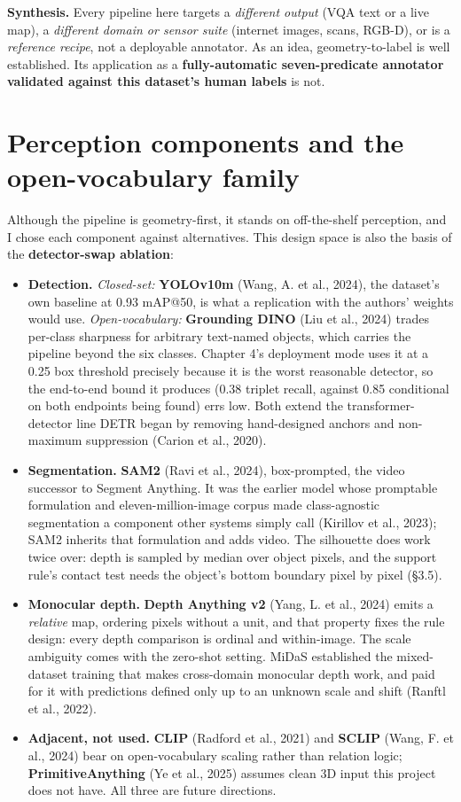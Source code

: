 \textbf{Synthesis.} Every pipeline here targets a \textit{different output} (VQA text or a live map), a \textit{different domain or sensor suite} (internet images, scans, RGB-D), or is a \textit{reference recipe}, not a deployable annotator. As an idea, geometry-to-label is well established. Its application as a \textbf{fully-automatic seven-predicate annotator validated against this dataset's human labels} is not.

\section{Perception components and the open-vocabulary family}

Although the pipeline is geometry-first, it stands on off-the-shelf perception, and I chose each component against alternatives. This design space is also the basis of the \textbf{detector-swap ablation}:

\begin{itemize}
\item \textbf{Detection.} \textit{Closed-set:} \textbf{YOLOv10m} (Wang, A. et al., 2024), the dataset's own baseline at 0.93 mAP@50, is what a replication with the authors' weights would use. \textit{Open-vocabulary:} \textbf{Grounding DINO} (Liu et al., 2024) trades per-class sharpness for arbitrary text-named objects, which carries the pipeline beyond the six classes. Chapter 4's deployment mode uses it at a 0.25 box threshold precisely because it is the worst reasonable detector, so the end-to-end bound it produces (0.38 triplet recall, against 0.85 conditional on both endpoints being found) errs low. Both extend the transformer-detector line DETR began by removing hand-designed anchors and non-maximum suppression (Carion et al., 2020).
\item \textbf{Segmentation.} \textbf{SAM2} (Ravi et al., 2024), box-prompted, the video successor to Segment Anything. It was the earlier model whose promptable formulation and eleven-million-image corpus made class-agnostic segmentation a component other systems simply call (Kirillov et al., 2023); SAM2 inherits that formulation and adds video. The silhouette does work twice over: depth is sampled by median over object pixels, and the support rule's contact test needs the object's bottom boundary pixel by pixel (\S{}3.5).
\item \textbf{Monocular depth.} \textbf{Depth Anything v2} (Yang, L. et al., 2024) emits a \textit{relative} map, ordering pixels without a unit, and that property fixes the rule design: every depth comparison is ordinal and within-image. The scale ambiguity comes with the zero-shot setting. MiDaS established the mixed-dataset training that makes cross-domain monocular depth work, and paid for it with predictions defined only up to an unknown scale and shift (Ranftl et al., 2022).
\item \textbf{Adjacent, not used.} \textbf{CLIP} (Radford et al., 2021) and \textbf{SCLIP} (Wang, F. et al., 2024) bear on open-vocabulary scaling rather than relation logic; \textbf{PrimitiveAnything} (Ye et al., 2025) assumes clean 3D input this project does not have. All three are future directions.
\end{itemize}

